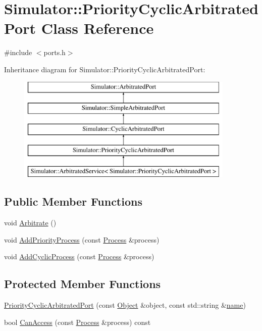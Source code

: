 \hypertarget{class_simulator_1_1_priority_cyclic_arbitrated_port}{\section{Simulator\+:\+:Priority\+Cyclic\+Arbitrated\+Port Class Reference}
\label{class_simulator_1_1_priority_cyclic_arbitrated_port}
}


{\ttfamily \#include $<$ports.\+h$>$}

Inheritance diagram for Simulator\+:\+:Priority\+Cyclic\+Arbitrated\+Port\+:\begin{figure}[H]
\begin{center}
\leavevmode
\includegraphics[height=5.000000cm]{class_simulator_1_1_priority_cyclic_arbitrated_port}
\end{center}
\end{figure}
\subsection*{Public Member Functions}
\begin{DoxyCompactItemize}
\item 
void \hyperlink{class_simulator_1_1_priority_cyclic_arbitrated_port_a6c3161850f07c3310d5b37bc9f323a0c}{Arbitrate} ()
\item 
void \hyperlink{class_simulator_1_1_priority_cyclic_arbitrated_port_ae5d941ef99e1a5615dd4f7975cfc0f49}{Add\+Priority\+Process} (const \hyperlink{class_simulator_1_1_process}{Process} \&process)
\item 
void \hyperlink{class_simulator_1_1_priority_cyclic_arbitrated_port_a6027f7e82e7e75150b6c647a3ca1b947}{Add\+Cyclic\+Process} (const \hyperlink{class_simulator_1_1_process}{Process} \&process)
\end{DoxyCompactItemize}
\subsection*{Protected Member Functions}
\begin{DoxyCompactItemize}
\item 
\hyperlink{class_simulator_1_1_priority_cyclic_arbitrated_port_a7c146645281d288bdfff495d96d0a5c4}{Priority\+Cyclic\+Arbitrated\+Port} (const \hyperlink{class_simulator_1_1_object}{Object} \&object, const std\+::string \&\hyperlink{mtconf_8c_a8f8f80d37794cde9472343e4487ba3eb}{name})
\item 
bool \hyperlink{class_simulator_1_1_priority_cyclic_arbitrated_port_a31050398a67f5e5659e24741ea26241e}{Can\+Access} (const \hyperlink{class_simulator_1_1_process}{Process} \&process) const 
\end{DoxyCompactItemize}
